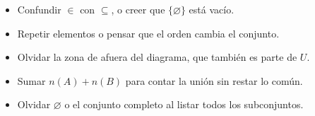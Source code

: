 \documentclass[11pt,a4paper]{article}
\begin{document}
\begin{ojo}
\begin{itemize}
\item Confundir $\in$ con $\subseteq$, o creer que $\{\varnothing\}$ está vacío.
\item Repetir elementos o pensar que el orden cambia el conjunto.
\item Olvidar la zona de afuera del diagrama, que también es parte de $U$.
\item Sumar $n(A)+n(B)$ para contar la unión sin restar lo común.
\item Olvidar $\varnothing$ o el conjunto completo al listar todos los subconjuntos.
\end{itemize}
\end{ojo}

\taller
\end{document}
